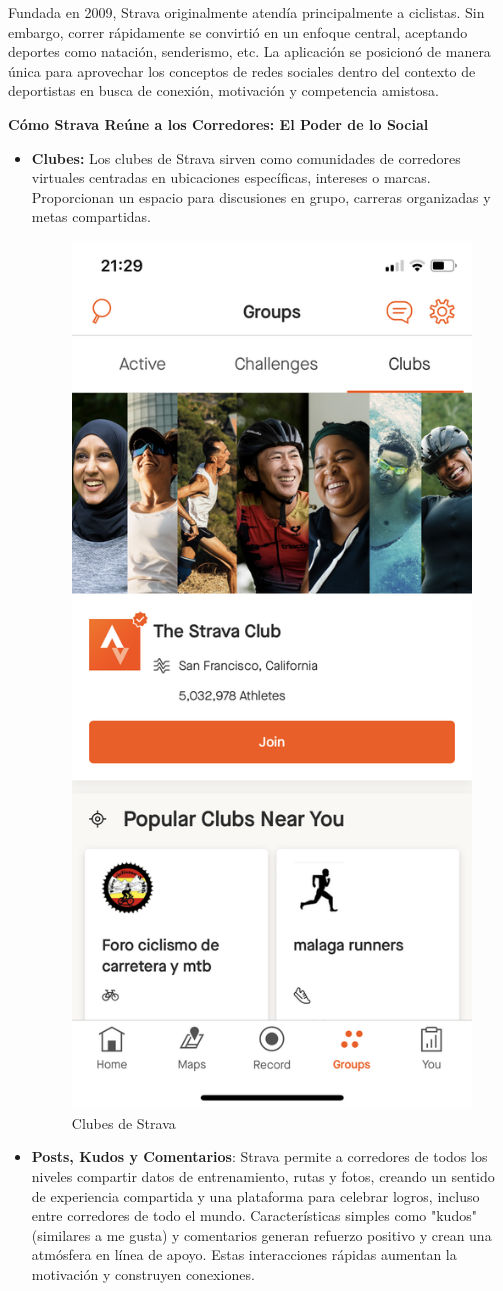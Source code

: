 Fundada en 2009, Strava originalmente atendía principalmente a ciclistas. 
Sin embargo, correr rápidamente se convirtió en un enfoque central, aceptando deportes como natación, senderismo, etc.
La aplicación se posicionó de manera única para aprovechar los conceptos de redes sociales dentro del contexto de 
deportistas  en busca de conexión, motivación y competencia amistosa.

\textbf{Cómo Strava Reúne a los Corredores: El Poder de lo Social}

\begin{itemize}

\item \textbf{Clubes:} Los clubes de Strava sirven como comunidades de corredores virtuales centradas en ubicaciones específicas, intereses 
o marcas. Proporcionan un espacio para discusiones en grupo, carreras organizadas y metas compartidas.

\begin{figure}[H]
  \centering
  \includegraphics[cframe=black 2pt,width=0.3\linewidth]{images/estadodelarte/stravaclubs.png}
  \caption{Clubes de Strava}
  \label{fig:strava_clubs}
\end{figure}

\item \textbf{Posts, Kudos y Comentarios}: Strava permite a corredores de todos los niveles compartir datos de entrenamiento, 
rutas y fotos, creando un sentido de experiencia compartida y una plataforma para celebrar logros, incluso entre corredores de 
todo el mundo. Características simples como "kudos" (similares a me gusta) y comentarios generan refuerzo positivo y crean una 
atmósfera en línea de apoyo. Estas interacciones rápidas aumentan la motivación y construyen conexiones.


\end{itemize}
